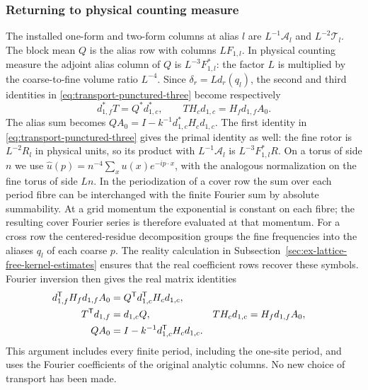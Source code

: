 \subsubsection{Returning to physical counting measure}
The installed one-form and two-form columns at alias $l$ are
$L^{-1}\mathcal A_l$ and $L^{-2}\mathcal T_l$.
The block mean $Q$ is the alias row with columns $LF_{1,l}$.
In physical counting measure the adjoint alias column of $Q$
is $L^{-3}F_{1,l}^*$: the factor $L$ is multiplied by the
coarse-to-fine volume ratio $L^{-4}$. Since
$\delta_r=Ld_r(q_l)$, the second and third identities in
\eqref{eq:transport-punctured-three} become respectively
\[
 d_{1,f}^*T=Q^*d_{1,c}^*,\qquad
                 TH_cd_{1,c}=H_fd_{1,f}A_0.
\]
The alias sum becomes $QA_0=I-k^{-1}d_{1,c}^*H_cd_{1,c}$.
The first identity in \eqref{eq:transport-punctured-three} gives
the primal identity as well: the fine rotor is $L^{-2}R_l$ in
physical units, so its product with $L^{-1}\mathcal A_l$ is
$L^{-3}F_{1,l}^*R$. On a torus of side $n$ we use
$\widehat u(p)=n^{-4}\sum_x u(x)e^{-ip\cdot x}$, with the analogous
normalization on the fine torus of side $Ln$. In the periodization
of a cover row the sum over each period fibre can be interchanged
with the finite Fourier sum by absolute summability. At a grid
momentum the exponential is constant on each fibre; the resulting
cover Fourier series is therefore evaluated at that momentum.
For a cross row the centered-residue decomposition groups the fine
frequencies into the aliases $q_l$ of each coarse $p$. The reality
calculation in Subsection~\ref{sec:ex-lattice-free-kernel-estimates}
ensures that the real coefficient rows recover these symbols.
Fourier inversion then gives the real matrix identities
\begin{align}\label{eq:transport-installed-identities}
 d_{1,f}^{\mathsf T}H_fd_{1,f}A_0
   &=Q^{\mathsf T}d_{1,c}^{\mathsf T}H_cd_{1,c},\notag\\
 T^{\mathsf T}d_{1,f}&=d_{1,c}Q,
 & TH_cd_{1,c}&=H_fd_{1,f}A_0,\notag\\
 QA_0&=I-k^{-1}d_{1,c}^{\mathsf T}H_cd_{1,c}.
\end{align}
This argument includes every finite period, including the one-site
period, and uses the Fourier coefficients of the original analytic
columns. No new choice of transport has been made.
